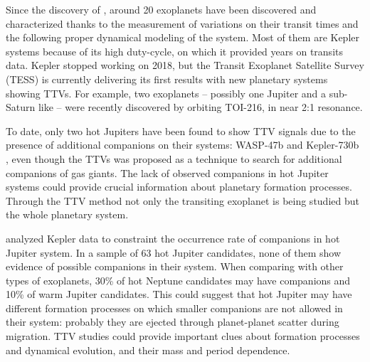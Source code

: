 Since the discovery of \cite{Holman2010}, around 20 exoplanets have been discovered and characterized thanks to the measurement of variations on their transit times and the following proper dynamical modeling of the system. Most of them are Kepler systems because of its high duty-cycle, on which it provided years on transits data. Kepler stopped working on 2018, but the Transit Exoplanet Satellite Survey (TESS) is currently delivering its first results with new planetary systems showing TTVs.  For example, two exoplanets -- possibly one Jupiter and a sub-Saturn like -- were recently discovered by \cite{Dawson2019} orbiting TOI-216, in near 2:1 resonance. 

To date, only two hot Jupiters have been found to show TTV signals due to the presence of additional companions on their systems: WASP-47b \citep{Becker2015} and Kepler-730b \citep{Canas2019}, even though the TTVs was proposed as a technique to search for additional companions of gas giants. The lack of observed companions in hot Jupiter systems could provide crucial information about planetary formation processes. Through the TTV method not only the transiting exoplanet is being studied but the whole planetary system. 

\cite{Steffen2012b} analyzed Kepler data to constraint the occurrence rate of companions in hot Jupiter system. In a sample of 63 hot Jupiter candidates, none of them show evidence of possible companions in their system. When comparing with other types of exoplanets, 30\% of hot Neptune candidates may have companions and 10\% of warm Jupiter candidates. This could suggest that hot Jupiter may have different formation processes on which smaller companions are not allowed in their system: probably they are ejected through planet-planet scatter during migration. TTV studies could provide important clues about formation processes and dynamical evolution, and their mass and period dependence. 